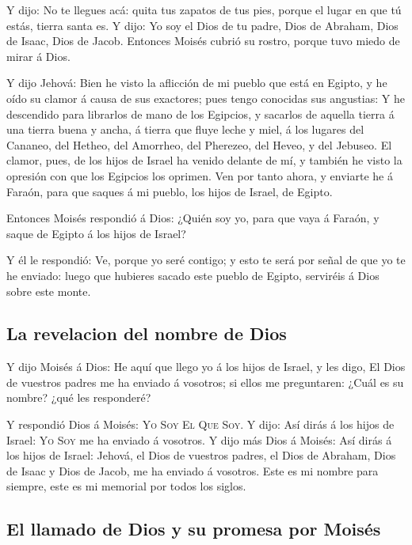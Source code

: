  Y dijo: No te llegues acá: quita tus zapatos de tus pies,
porque el lugar en que tú estás, tierra santa es.  Y dijo:
Yo soy el Dios de tu padre, Dios de Abraham, Dios de Isaac, Dios de
Jacob. Entonces Moisés cubrió su rostro, porque tuvo miedo de mirar á
Dios.

 Y dijo Jehová: Bien he visto la aflicción de mi pueblo
que está en Egipto, y he oído su clamor á causa de sus exactores; pues
tengo conocidas sus angustias:  Y he descendido para
librarlos de mano de los Egipcios, y sacarlos de aquella tierra á una
tierra buena y ancha, á tierra que fluye leche y miel, á los lugares del
Cananeo, del Hetheo, del Amorrheo, del Pherezeo, del Heveo, y del
Jebuseo.  El clamor, pues, de los hijos de Israel ha
venido delante de mí, y también he visto la opresión con que los
Egipcios los oprimen.  Ven por tanto ahora, y enviarte he
á Faraón, para que saques á mi pueblo, los hijos de Israel, de Egipto.

 Entonces Moisés respondió á Dios: ¿Quién soy yo, para
que vaya á Faraón, y saque de Egipto á los hijos de Israel?

 Y él le respondió: Ve, porque yo seré contigo; y esto te
será por señal de que yo te he enviado: luego que hubieres sacado este
pueblo de Egipto, serviréis á Dios sobre este monte.

\hypertarget{la-revelacion-del-nombre-de-dios}{%
\subsection{La revelacion del nombre de
Dios}\label{la-revelacion-del-nombre-de-dios}}

 Y dijo Moisés á Dios: He aquí que llego yo á los hijos
de Israel, y les digo, El Dios de vuestros padres me ha enviado á
vosotros; si ellos me preguntaren: ¿Cuál es su nombre? ¿qué les
responderé?

 Y respondió Dios á Moisés: \textsc{Yo} \textsc{Soy}
\textsc{El} \textsc{Que} \textsc{Soy}. Y dijo: Así dirás á los hijos de
Israel: \textsc{Yo} \textsc{Soy} me ha enviado á vosotros.
 Y dijo más Dios á Moisés: Así dirás á los hijos de
Israel: Jehová, el Dios de vuestros padres, el Dios de Abraham, Dios de
Isaac y Dios de Jacob, me ha enviado á vosotros. Este es mi nombre para
siempre, este es mi memorial por todos los siglos.

\hypertarget{el-llamado-de-dios-y-su-promesa-por-moisuxe9s}{%
\subsection{El llamado de Dios y su promesa por
Moisés}\label{el-llamado-de-dios-y-su-promesa-por-moisuxe9s}}

